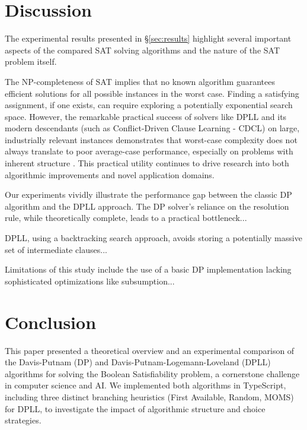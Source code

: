 \documentclass[12pt, a4paper]{article}
\begin{document}
\section{Discussion}
\label{sec:discussion}

The experimental results presented in \S\ref{sec:results} highlight several important aspects of the compared SAT solving algorithms and the nature of the SAT problem itself.

The NP-completeness of SAT implies that no known algorithm guarantees efficient solutions for all possible instances in the worst case. Finding a satisfying assignment, if one exists, can require exploring a potentially exponential search space. However, the remarkable practical success of solvers like DPLL and its modern descendants (such as Conflict-Driven Clause Learning - CDCL) on large, industrially relevant instances demonstrates that worst-case complexity does not always translate to poor average-case performance, especially on problems with inherent structure \cite{Autoblocks}. This practical utility continues to drive research into both algorithmic improvements and novel application domains.

Our experiments vividly illustrate the performance gap between the classic DP algorithm and the DPLL approach. The DP solver's reliance on the resolution rule, while theoretically complete, leads to a practical bottleneck... %

DPLL, using a backtracking search approach, avoids storing a potentially massive set of intermediate clauses... %

Limitations of this study include the use of a basic DP implementation lacking sophisticated optimizations like subsumption... %

\section{Conclusion}
\label{sec:conclusion}

This paper presented a theoretical overview and an experimental comparison of the Davis-Putnam (DP) and Davis-Putnam-Logemann-Loveland (DPLL) algorithms for solving the Boolean Satisfiability problem, a cornerstone challenge in computer science and AI. We implemented both algorithms in TypeScript, including three distinct branching heuristics (First Available, Random, MOMS) for DPLL, to investigate the impact of algorithmic structure and choice strategies.
\end{document}
